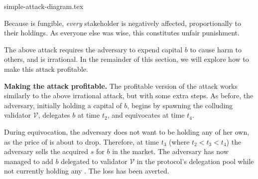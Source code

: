 {simple-attack-diagram.tex}


Because \stasset is fungible, \emph{every} stakeholder is negatively affected,
proportionally to their holdings.
As everyone else was
wise, this constitutes unfair punishment.

The above attack requires the adversary to expend capital $b$ to cause
harm to others, and is irrational. In the remainder of this section, we
will explore how to make this attack profitable.


\noindent
\textbf{Making the attack profitable.}
The profitable version of the attack works similarly to the above
irrational attack, but with some extra steps. As before, the adversary, initially
holding a capital of $b$, begins by spawning the colluding validator $\mathcal{V}$,
delegates $b$ at time $t_2$, and equivocates at time $t_4$.

During equivocation, the adversary does not want to be holding any
\stasset of her own, as the price of \stasset is about to drop.
Therefore, at time $t_3$ (where $t_2 < t_3 < t_4$) the adversary sells
the acquired $s$ \stasset for $b$ \asset in the market.
The adversary has now managed to add $b$ \asset delegated to validator $\mathcal{V}$
in the protocol's delegation pool while not currently holding
any \stasset. The loss has been averted.


